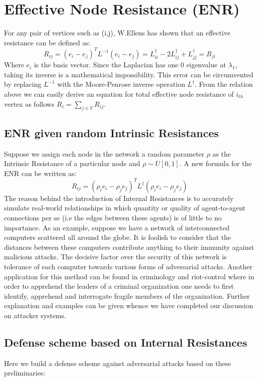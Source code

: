 \documentclass{article}
\begin{document}
	\section{Effective Node Resistance (ENR)}
	For any pair of vertices such as (i,j), W.Ellens \cite{ellens2013graph} has shown that an effective resistance can be defined as:
	\begin{equation}
		R_{ij} = (e_i-e_j)^T  L^{-1} (e_i-e_j) = L_{ii}^{\dag} -2L_{ij}^{\dag} + L_{jj}^{\dag}= R_{ji}
	\end{equation}
	Where $e_i$ is the basis vector. Since the Laplacian has one 0 eigenvalue at $\lambda_1$, taking its inverse is a mathematical impossibility. This error can be circumvented by replacing $L^{-1}$ with the Moore-Penrose inverse operation $L^\dag$. From the relation above we can easily derive an equation for total effective node resistance of $i_{th}$ vertex as follows $R_i = \sum_{j\in V}R_{ij}$.
	
	\subsection{ENR given random Intrinsic Resistances}
	Suppose we assign each node in the network a random parameter $\rho$ as the Intrinsic Resistance of a particular node and $\rho \sim U[0,1]$. A new formula for the ENR can be written as:
	\begin{equation}
		R_{ij} = (\rho_i e_i - \rho_j e_j)^T L^{\dag} (\rho_i e_i - \rho_j e_j)
	\end{equation}
	The reason behind the introduction of Internal Resistances is to accurately simulate real-world relationships in which quantity or quality of agent-to-agent connections per se (i.e the edges between these agents) is of little to no importance. As an example, suppose we have a network of interconnected computers scattered all around the globe. It is foolish to consider that the distances between these computers contribute anything to their immunity against malicious attacks. The decisive factor over the security of this network is tolerance of each computer towards various forms of adversarial attacks. Another application for this method can be found in criminology and riot-control where in order to apprehend the leaders of a criminal organization one needs to first identify, apprehend and interrogate fragile members of the organization. Further explanation and examples can be given whence we have completed our discussion on attacker systems.
	\subsection{Defense scheme based on Internal Resistances}
	Here we build a defense scheme against adversarial attacks based on these preliminaries:
	
\end{document}
